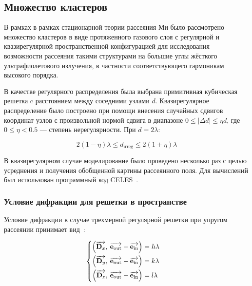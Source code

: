 \subsection{Множество кластеров}

В рамках в рамках стационарной теории рассеяния Ми было рассмотрено множество кластеров в виде протяженного газового слоя с регулярной и квазирегулярной пространственной конфигурацией для исследования возможности рассеяния такими структурами на большие углы жёсткого ультрафиолетового излучения, в частности соответствующего гармоникам высокого порядка.

В качестве регулярного распределения была выбрана примитивная кубическая решетка c расстоянием между соседними узлами $d$. Квазирегулярное распределение было построено при помощи внесения случайных сдвигов координат узлов с произвольной нормой сдвига в диапазоне $0 \leq |\Delta d| \leq \eta d$, где $0 \leq \eta < 0.5$ --- степень нерегулярности. При $d = 2\lambda$:

    \begin{equation}
        2\left(1 - \eta\right)\lambda \le d_{\textrm{irreg}} \le 2\left(1 + \eta\right)\lambda
    \end{equation}

В квазирегулярном случае моделирование было проведено несколько раз с целью усреднения и получения обобщенной картины рассеянного поля. Для вычислений был использован программный код CELES~\cite{celes}.

\subsubsection{Условие дифракции для решетки в пространстве}


Условие дифракции в случае трехмерной регулярной решетки при упругом рассеянии принимает вид~\cite{Kittel86}:

    \begin{equation}
        \begin{cases}
        \begin{aligned}
            \left( \overrightarrow{\textbf{D}_{x}},\: \overrightarrow{\textbf{e}_{\textrm{out}}} - \overrightarrow{\textbf{e}_{\textrm{in}}}\right) &= h \lambda
            \\
            \left( \overrightarrow{\textbf{D}_{y}},\: \overrightarrow{\textbf{e}_{\textrm{out}}} - \overrightarrow{\textbf{e}_{\textrm{in}}}\right) &= k \lambda
            \\
            \left( \overrightarrow{\textbf{D}_{z}},\: \overrightarrow{\textbf{e}_{\textrm{out}}} - \overrightarrow{\textbf{e}_{\textrm{in}}}\right) &= l \lambda
        \end{aligned}
        \end{cases}
        \label{bragg_wolf_order}
    \end{equation}

